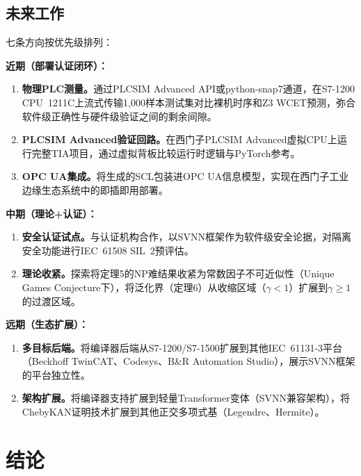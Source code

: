 \documentclass[journal,onecolumn]{IEEEtran}
\theoremstyle{definition}
\theoremstyle{plain}
\theoremstyle{remark}
\begin{document}
\subsection{未来工作}

七条方向按优先级排列：

\textbf{近期（部署认证闭环）：}
\begin{enumerate}[leftmargin=*]
    \item \textbf{物理PLC测量。}通过PLCSIM Advanced API或python-snap7通道，在S7-1200 CPU~1211C上流式传输1,000样本测试集对比裸机时序和Z3 WCET预测，弥合软件级正确性与硬件级验证之间的剩余间隙。
    \item \textbf{PLCSIM Advanced验证回路。}在西门子PLCSIM Advanced虚拟CPU上运行完整TIA项目，通过虚拟背板比较运行时逻辑与PyTorch参考。
    \item \textbf{OPC UA集成。}将生成的SCL包装进OPC UA信息模型，实现在西门子工业边缘生态系统中的即插即用部署。
\end{enumerate}

\textbf{中期（理论+认证）：}
\begin{enumerate}[leftmargin=*,start=4]
    \item \textbf{安全认证试点。}与认证机构合作，以SVNN框架作为软件级安全论据，对隔离安全功能进行IEC~61508 SIL~2预评估。
    \item \textbf{理论收紧。}探索将定理5的NP难结果收紧为常数因子不可近似性（Unique Games Conjecture下），将泛化界（定理6）从收缩区域（$\gamma < 1$）扩展到$\gamma \geq 1$的过渡区域。
\end{enumerate}

\textbf{远期（生态扩展）：}
\begin{enumerate}[leftmargin=*,start=6]
    \item \textbf{多目标后端。}将编译器后端从S7-1200/S7-1500扩展到其他IEC~61131-3平台（Beckhoff TwinCAT、Codesys、B\&R Automation Studio），展示SVNN框架的平台独立性。
    \item \textbf{架构扩展。}将编译器支持扩展到轻量Transformer变体（SVNN兼容架构），将ChebyKAN证明技术扩展到其他正交多项式基（Legendre、Hermite）。
\end{enumerate}

\section{结论}
\label{sec:conclusion}
\end{document}
